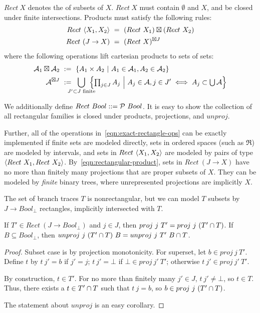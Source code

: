 \begin{definition}
\label{def:standard-rectangle}
$Rect~X$ denotes the  of subsets of $X$.
$Rect~X$ must contain $\emptyset$ and $X$, and be closed under finite intersections.
Products must satisfy the following rules:
\begin{align}
	Rect~\langle{X_1,X_2}\rangle &\ = \ (Rect~X_1) \boxtimes (Rect~X_2)
	\label{eqn:standard-rect-finite-product-rule}
\\
	Rect~(J \to X) &\ = \ (Rect~X)^{\boxtimes J}
	\label{eqn:standard-rect-arbitrary-product-rule}
\end{align}
where the following operations lift cartesian products to sets of sets:
\begin{align}
	\A_1 \boxtimes \A_2 &\ := \ \setb{A_1 \times A_2}{A_1 \in \A_1, A_2 \in \A_2}
\\
	\A^{\boxtimes J} &\ := \ \!\!\!\!\!\!\!\displaystyle\bigcup_{J' \subset J \text{ finite}}\!\!\!\!\!\! \left\{\textstyle\prod_{j \in J} A_j\ \middle|\ A_j \in \A, j \in J' \iff A_j \subset \U\A\right\}
\label{eqn:rectangular-product}
\end{align}
\end{definition}

We additionally define $Rect~Bool ::= \mathcal{P}~Bool$.
It is easy to show the collection of all rectangular families is closed under products, projections, and $unproj$.

Further, all of the operations in~\eqref{eqn:exact-rectangle-ops} can be exactly implemented if finite sets are modeled directly, sets in ordered spaces (such as $\Re$) are modeled by intervals, and sets in $Rect~\langle{X_1,X_2}\rangle$ are modeled by pairs of type $\langle{Rect~X_1,Rect~X_2}\rangle$.
By~\eqref{eqn:rectangular-product}, sets in $Rect~(J \to X)$ have no more than finitely many projections that are proper subsets of $X$.
They can be modeled by \emph{finite} binary trees, where unrepresented projections are implicitly $X$.

The set of branch traces $T$ is nonrectangular, but we can model $T$ subsets by $J \to Bool_\bot$ rectangles, implicitly intersected with $T$.

\begin{theorem}[$T$ model]
If $T' \in Rect~(J \to Bool_\bot)$ and $j \in J$, then $proj~j~T' = proj~j~(T' \cap T)$.
If $B \subseteq Bool_\bot$, then $unproj~j~(T' \cap T)~B = unproj~j~T'~B \cap T$.
\end{theorem}
\begin{proof}
Subset case is by projection monotonicity.
For superset, let $b \in proj~j~T'$.
Define $t$ by $t~j' = b$ if $j' = j$; $t~j' = \bot$ if $\bot \in proj~j'~T'$; otherwise $t~j' \in proj~j'~T'$.

By construction, $t \in T'$.
For no more than finitely many $j' \in J$, $t~j' \neq \bot$, so $t \in T$.
Thus, there exists a $t \in T' \cap T$ such that $t~j = b$, so $b \in proj~j~(T' \cap T)$.

The statement about $unproj$ is an easy corollary.
\end{proof}

